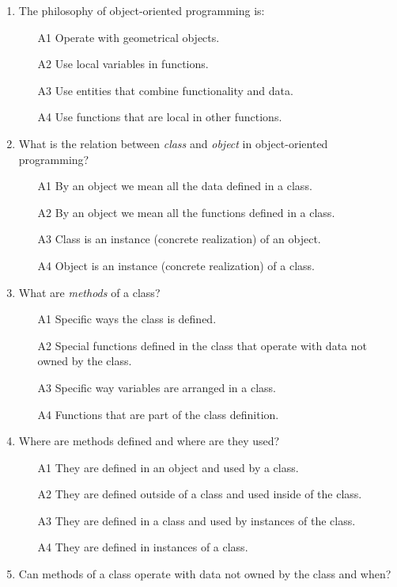 \begin{enumerate}
\item The philosophy of object-oriented programming is:
\begin{enumerate}
\item[A1] Operate with geometrical objects.
\item[A2] Use local variables in functions.
\item[A3] Use entities that combine functionality and data.
\item[A4] Use functions that are local in other functions.
\end{enumerate}
\item What is the relation between {\em class} and {\em object} in object-oriented programming?
\begin{enumerate}
\item[A1] By an object we mean all the data defined in a class.
\item[A2] By an object we mean all the functions defined in a class.
\item[A3] Class is an instance (concrete realization) of an object.
\item[A4] Object is an instance (concrete realization) of a class.
\end{enumerate}
\item What are {\em methods} of a class?
\begin{enumerate}
\item[A1] Specific ways the class is defined.
\item[A2] Special functions defined in the class that operate with data not owned by the class.
\item[A3] Specific way variables are arranged in a class.
\item[A4] Functions that are part of the class definition.
\end{enumerate}
\item Where are methods defined and where are they used?
\begin{enumerate}
\item[A1] They are defined in an object and used by a class.
\item[A2] They are defined outside of a class and used inside of the class.
\item[A3] They are defined in a class and used by instances of the class.
\item[A4] They are defined in instances of a class.
\end{enumerate}
\item Can methods of a class operate with data not owned by the class and when?

\end{enumerate}
